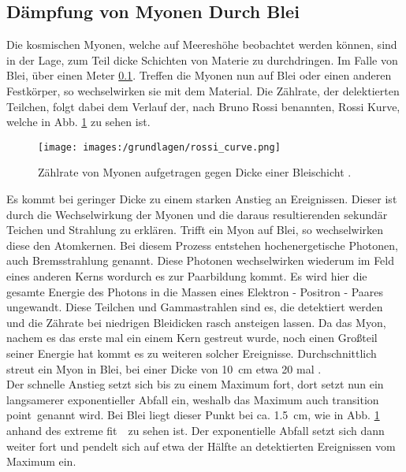 \subsection{Dämpfung von Myonen Durch Blei}
Die kosmischen Myonen, welche auf Meereshöhe beobachtet werden können, sind in der Lage, zum Teil dicke Schichten von Materie zu durchdringen. 
Im Falle von Blei, über einen Meter \ref{}. 
Treffen die Myonen nun auf Blei oder einen anderen Festkörper, so wechselwirken sie mit dem Material.  
Die Zählrate, der delektierten Teilchen, folgt dabei dem Verlauf der, nach Bruno Rossi benannten, Rossi Kurve, welche in Abb. \ref{fig:rossi_curve} zu sehen ist. 

\begin{figure}[H]
    \centering
    \texttt{[image: images:/grundlagen/rossi\_curve.png]}
    \caption{ Zählrate von Myonen aufgetragen gegen Dicke einer Bleischicht   \cite{Altameemi2019}.}
    \label{fig:rossi_curve}
\end{figure}

Es kommt bei geringer Dicke zu einem starken Anstieg an Ereignissen. 
Dieser ist durch die Wechselwirkung der Myonen und die daraus resultierenden sekundär Teichen und Strahlung zu erklären.
\newpage
Trifft ein Myon auf Blei, so wechselwirken diese den Atomkernen. 
Bei diesem Prozess entstehen hochenergetische Photonen, auch Bremsstrahlung genannt. 
Diese Photonen wechselwirken wiederum im Feld eines anderen Kerns wordurch es zur Paarbildung kommt. 
Es wird hier die gesamte Energie des Photons in die Massen eines Elektron - Positron - Paares ungewandt. 
Diese Teilchen und Gammastrahlen sind es, die detektiert werden und die Zährate bei niedrigen Bleidicken rasch ansteigen lassen. 
Da das Myon, nachem es das erste mal ein einem Kern gestreut wurde, noch einen Großteil seiner Energie hat kommt es zu weiteren solcher Ereignisse. 
Durchschnittlich streut ein Myon in Blei, bei einer Dicke von \SI{10}{cm} etwa 20 mal \cite{Altameemi2019}.\\
\newline
Der schnelle Anstieg setzt sich bis zu einem Maximum fort, dort setzt nun ein langsamerer exponentieller Abfall ein, weshalb das Maximum auch \glqq transition point\grqq \ genannt wird. 
Bei Blei liegt dieser Punkt bei ca. \SI{1,5}{cm}, wie in Abb. \ref{fig:rossi_curve} anhand des \glqq extreme fit\grqq\
 \ zu sehen ist. 
Der exponentielle Abfall setzt sich dann weiter fort und pendelt sich auf etwa der Hälfte an detektierten Ereignissen vom Maximum ein. 


